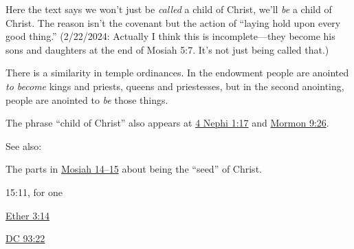 		Here the text says we won't just be \textit{called} a child of Christ, we'll \textit{be} a child of Christ. The reason isn't the covenant but the action of ``laying hold upon every good thing.'' (2/22/2024: Actually I think this is incomplete---they become his sons and daughters at the end of Mosiah 5:7. It's not just being called that.)
		
		There is a similarity in temple ordinances. In the endowment people are anointed \textit{to become} kings and priests, queens and priestesses, but in the second anointing, people are anointed to \textit{be} those things.
		
		The phrase ``child of Christ'' also appears at \hyperref[4NEPHI-1:17]{4 Nephi 1:17} and \hyperref[MORMON-9-26]{Mormon 9:26}.
		
		See also:
			\begin{compactitem}
				\item The parts in \hyperref[MOSIAH-14]{Mosiah 14--15} about being the ``seed'' of Christ.
					\begin{compactitem}
						\item 15:11, for one
					\end{compactitem}
				\item \hyperref[ETHER-3-14]{Ether 3:14}
				\item \hyperref[DC93-22]{DC 93:22}
			\end{compactitem}